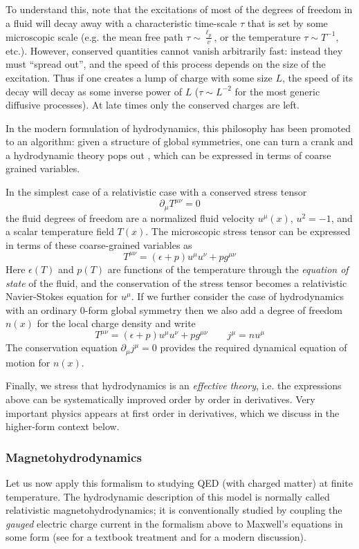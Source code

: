 \documentclass[aps,preprint,nofootinbib,preprintnumbers,eqsecnum,superscriptaddress]{revtex4}
\newcommand{\be}{\begin{equation}}
\newcommand{\ee}{\end{equation}}
\def\ep{{\epsilon}}
\newcommand{\p}{\partial}
\numberwithin{equation}{section}
\begin{document}
To understand this, note that the excitations of most of the degrees of freedom in a fluid will decay away with a characteristic time-scale $\tau$ that is set by some microscopic scale (e.g. the mean free path $\tau \sim \frac{\ell_p}{v}$, or the temperature $\tau \sim T^{-1}$, etc.). However, conserved quantities cannot vanish arbitrarily fast: instead they must ``spread out'', and the speed of this process depends on the size of the excitation. Thus if one creates a lump of charge with some size $L$, the speed of its decay will decay as some inverse power of $L$ ($\tau \sim L^{-2}$ for the most generic diffusive processes). At late times only the conserved charges are left. 

In the modern formulation of hydrodynamics, this philosophy has been promoted to an algorithm: given a structure of global symmetries, one can turn a crank and a hydrodynamic theory pops out \cite{Kovtun:2012rj}, which can be expressed in terms of coarse grained variables. 

In the simplest case of a relativistic case with a conserved stress tensor
\be
\p_{\mu} T^{\mu\nu} = 0 \label{consT} 
\ee
the fluid degrees of freedom are a normalized fluid velocity $u^{\mu}(x)$, $u^2 = -1$, and a scalar temperature field $T(x)$. The microscopic stress tensor can be expressed in terms of these coarse-grained variables as
\be
T^{\mu\nu} = (\ep + p)u^{\mu} u^{\nu} + p g^{\mu\nu}
\ee
Here $\ep(T)$ and $p(T)$ are functions of the temperature through the {\it equation of state} of the fluid, and the conservation of the stress tensor becomes a relativistic Navier-Stokes equation for $u^{\mu}$. If we further consider the case of hydrodynamics with an ordinary $0$-form global symmetry then we also add a degree of freedom $n(x)$ for the local charge density and write
\be
T^{\mu\nu} = (\ep + p)u^{\mu} u^{\nu} + p g^{\mu\nu} \qquad j^{\mu} = n u^{\mu}
\ee
The conservation equation $\p_{\mu} j^{\mu} = 0$ provides the required dynamical equation of motion for $n(x)$.  

Finally, we stress that hydrodynamics is an {\it effective theory}, i.e. the expressions above can be systematically improved order by order in derivatives. Very important physics appears at first order in derivatives, which we discuss in the higher-form context below.  

\subsubsection{Magnetohydrodynamics}
Let us now apply this formalism to studying QED (with charged matter) at finite temperature. The hydrodynamic description of this model is normally called relativistic magnetohydrodynamics; it is conventionally studied by coupling the {\it gauged} electric charge current in the formalism above to Maxwell's equations in some form (see \cite{bellan2008fundamentals} for a textbook treatment and \cite{Hernandez:2017mch} for a modern discussion). 
\end{document}
